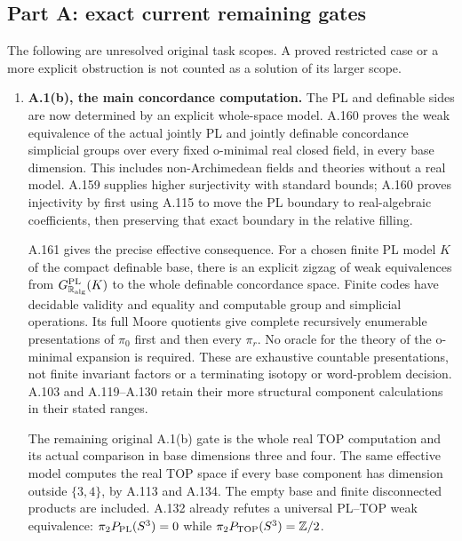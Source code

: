 \subsection*{Part A: exact current remaining gates}
The following are unresolved original task scopes. A proved restricted
case or a more explicit obstruction is not counted as a solution of its
larger scope.
\begin{enumerate}
\item \textbf{A.1(b), the main concordance computation.}
The PL and definable sides are now determined by an explicit whole-space
model. A.160 proves the weak equivalence of the actual jointly PL and
jointly definable concordance simplicial groups over every fixed
o-minimal real closed field, in every base dimension. This includes
non-Archimedean fields and theories without a real model. A.159 supplies
higher surjectivity with standard bounds; A.160 proves injectivity by
first using A.115 to move the PL boundary to real-algebraic coefficients,
then preserving that exact boundary in the relative filling.

A.161 gives the precise effective consequence. For a chosen finite PL
model $K$ of the compact definable base, there is an explicit zigzag of
weak equivalences from $G^{\rm PL}_{\mathbb R_{\rm alg}}(K)$ to the whole
definable concordance space. Finite codes have decidable validity and
equality and computable group and simplicial operations. Its full Moore
quotients give complete recursively enumerable presentations of
$\pi_0$ first and then every $\pi_r$. No oracle for the theory of the
o-minimal expansion is required. These are exhaustive countable
presentations, not finite invariant factors or a terminating isotopy
or word-problem decision. A.103 and A.119--A.130 retain their more
structural component calculations in their stated ranges.

The remaining original A.1(b) gate is the whole real TOP computation
and its actual comparison in base dimensions three and four. The same
effective model computes the real TOP space if every base component has
dimension outside $\{3,4\}$, by A.113 and A.134. The empty base and finite
disconnected products are included. A.132 already refutes a universal
PL--TOP weak equivalence: $\pi_2P_{\rm PL}(S^3)=0$ while
$\pi_2P_{\rm TOP}(S^3)=\mathbb Z/2$.


\end{enumerate}
